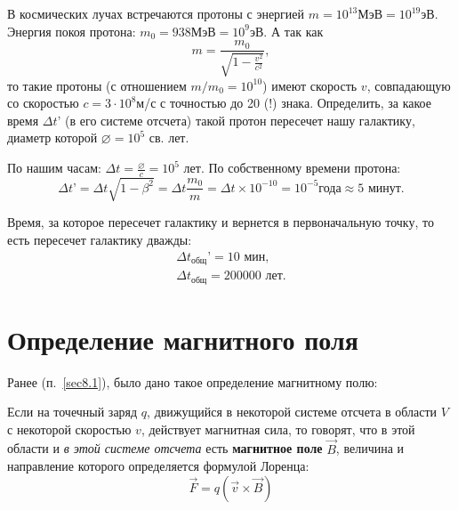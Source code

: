     \begin{example} 
        В космических лучах встречаются протоны с энергией
        \( m = 10^{13}\text{МэВ} = 10^{19}\text{эВ} \). Энергия покоя протона:
        \( m_0 = 938\text{МэВ} = 10^9\text{эВ} \). А так как
        \[
            m = \frac{m_0}{\sqrt{1 - \frac{v^2}{c^2}}},
        \]
        то  такие протоны (с отношением \( m/m_0 = 10^{10} \)) имеют скорость
        \( v \), совпадающую со скоростью \( c = 3\cdot10^8 \)м/с с точностью до
        20 (!) знака. Определить, за какое время \( \Delta t’ \) (в его системе
        отсчета) такой протон пересечет нашу галактику, диаметр которой
        \( \diameter = 10^5 \) св. лет.
    \end{example}
    \begin{solution}
        По нашим часам: \( \Delta t = \frac{\diameter}{c} = 10^5 \) лет.
        По собственному времени протона:
        \[
            \Delta t’ = \Delta t\sqrt{1 - \beta^2} = \Delta t\frac{m_0}{m} =
            \Delta t \times 10^{-10} = 10^{-5}\text{года} \approx
            5\text{ минут}.
        \]

        Время, за которое пересечет галактику и вернется в первоначальную точку,
        то есть пересечет галактику дважды:
        \begin{align*}
                \Delta t_\textit{общ}{’} = 10\text{ мин}, \\
                \Delta t_\textit{общ} = 200000\text{ лет}.
        \end{align*}
    \end{solution}
\section{Определение магнитного поля}

	Ранее (п.~\ref{sec8.1}), было дано такое определение магнитному полю:
	\begin{definition}
        Если на точечный заряд \( q \), движущийся в некоторой системе отсчета в
        области \( V \) с некоторой скоростью \( v \), действует магнитная сила,
        то говорят, что в этой области и \textit{в этой системе отсчета} есть
        \textbf{магнитное поле} \( \vec{B} \), величина и направление которого
        определяется формулой Лоренца:
        \begin{equation}
            \vec{F} = q(\vec{v} \times \vec{B}) \label{eq24:1}
        \end{equation}
	\end{definition}
    
